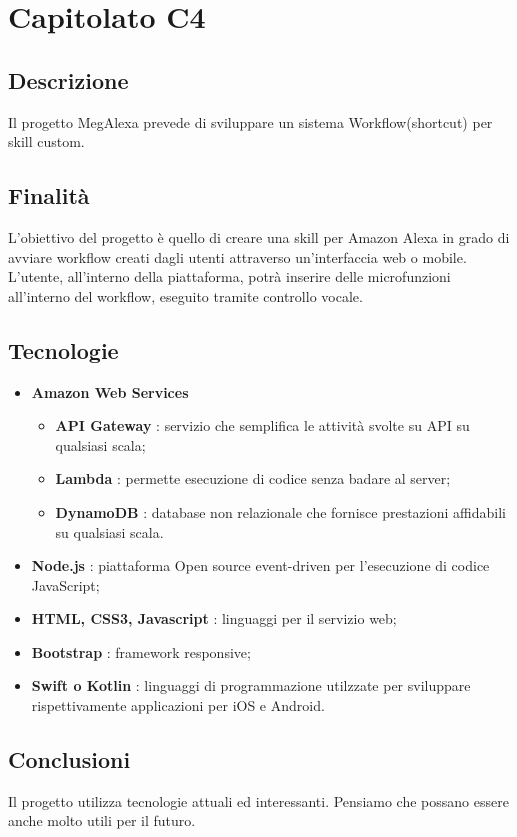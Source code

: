 \section{Capitolato C4}
	\subsection{Descrizione}
		Il progetto MegAlexa prevede di sviluppare un sistema Workflow(shortcut) per skill custom.
	\subsection{Finalità}
		L'obiettivo del progetto è quello di creare una skill per Amazon Alexa in grado di avviare workflow creati dagli utenti attraverso un'interfaccia web o mobile.
		L'utente, all'interno della piattaforma, potrà inserire delle microfunzioni all'interno del workflow, eseguito tramite controllo vocale.
	\subsection{Tecnologie}
		\begin{itemize}
			\item \textbf{Amazon Web Services}
				\begin{itemize}
					\item \textbf{API Gateway} : servizio che semplifica le attività svolte su API su qualsiasi scala;
					\item \textbf{Lambda} : permette esecuzione di codice senza badare al server;
					\item \textbf{DynamoDB} : database non relazionale che fornisce prestazioni affidabili su qualsiasi scala.
				\end{itemize}
			\item \textbf{Node.js} : piattaforma Open source event-driven per l'esecuzione di codice JavaScript;
			\item \textbf{HTML, CSS3, Javascript} : linguaggi per il servizio web;
			\item \textbf{Bootstrap} : framework responsive;
			\item \textbf{Swift o Kotlin} : linguaggi di programmazione utilzzate per sviluppare rispettivamente applicazioni per iOS e Android.
		\end{itemize}
	\subsection{Conclusioni}
		Il progetto utilizza tecnologie attuali ed interessanti. Pensiamo che possano essere anche molto utili per il futuro.